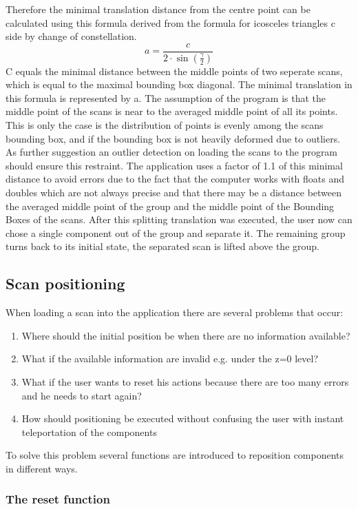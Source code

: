 \documentclass[hyperref,english,bachelorofscience,bibnum]{cgvpub}
\begin{document}
Therefore the minimal translation distance from the centre point can be calculated using this formula derived from the formula for icosceles triangles c side by change of constellation.
\[
{\displaystyle  a= {\frac {c}{2 \cdot \sin \left({\frac {\gamma }{2}}\right)}} }
\]
C equals the minimal distance between the middle points of two seperate scans, which is equal to the maximal bounding box diagonal. The minimal translation in this formula is represented by a.
The assumption of the program is that the middle point of the scans is near to the averaged middle point of all its points. This is only the case is the distribution of points is evenly among the scans bounding box, and if the bounding box is not heavily deformed due to outliers.
As further suggestion an outlier detection on loading the scans to the program should ensure this restraint.
The application uses a factor of 1.1 of this minimal distance to avoid errors due to the fact that the computer works with floats and doubles which are not always precise and that there may be a distance between the averaged middle point of the group and the middle point of the Bounding Boxes of the scans.
After this splitting translation was executed, the user now can chose a single component out of the group and separate it. The remaining group turns back to its initial state, the separated scan is lifted above the group.

\subsection{Scan positioning}

When loading a scan into the application there are several problems that occur:
\begin{enumerate}
\item Where should the initial position be when there are no information available?
\item What if the available information are invalid e.g. under the z=0 level?
\item What if the user wants to reset his actions because there are too many errors and he needs to start again?
\item How should positioning be executed without confusing the user with instant teleportation of the components
\end{enumerate}
To solve this problem several functions are introduced to reposition components in different ways.


\subsubsection{The reset function}
\end{document}
